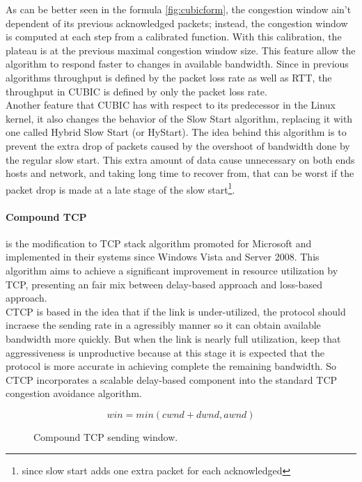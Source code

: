 As can be better seen in the formula \ref{fig:cubicform}, the congestion
window ain't dependent of its previous acknowledged packets; instead, the
congestion window is computed at each step from a calibrated function. With
this calibration, the plateau is at the previous maximal congestion window
size. This feature allow the algorithm to respond faster to changes in
available bandwidth. Since in previous algorithms throughput is defined by the
packet loss rate as well as RTT, the throughput in CUBIC is defined by only
the packet loss rate.\\

Another feature that CUBIC has with respect to its predecessor in the Linux
kernel, it also changes the behavior of the Slow Start algorithm, replacing it
with one called Hybrid Slow Start (or HyStart)\cite{HaElephants}. The idea
behind this algorithm is to prevent the extra drop of packets caused by the
overshoot of bandwidth done by the regular slow start. This extra amount of
data cause unnecessary on both ends hosts and network, and taking long time to
recover from, that can be worst if the packet drop is made at a late stage of
the slow start\footnote{since slow start adds one extra packet for each
acknowledged}.\\

\paragraph{Compound TCP} is the modification to TCP stack algorithm promoted
for Microsoft and implemented in their systems since Windows Vista and Server
2008. This algorithm aims to achieve a significant improvement in resource
utilization by TCP, presenting an fair mix between delay-based approach and
loss-based approach.\\

CTCP is based in the idea that if the link is under-utilized, the protocol
should incraese the sending rate in a agressibly manner so it can obtain
available bandwidth more quickly. But when the link is nearly full
utilization, keep that aggressiveness is unproductive because at this stage it
is expected that the protocol is more accurate in achieving complete the
remaining bandwidth. So CTCP incorporates a scalable delay-based component
into the standard TCP congestion avoidance algorithm\cite{4146841}.\\

\begin{figure}
  \begin{center}
    \[ win = min(cwnd + dwnd, awnd)\]
  \end{center}
  \caption{Compound TCP sending window.\protect\footnotemark}
  \label{fig:ctcpform}
\end{figure}


